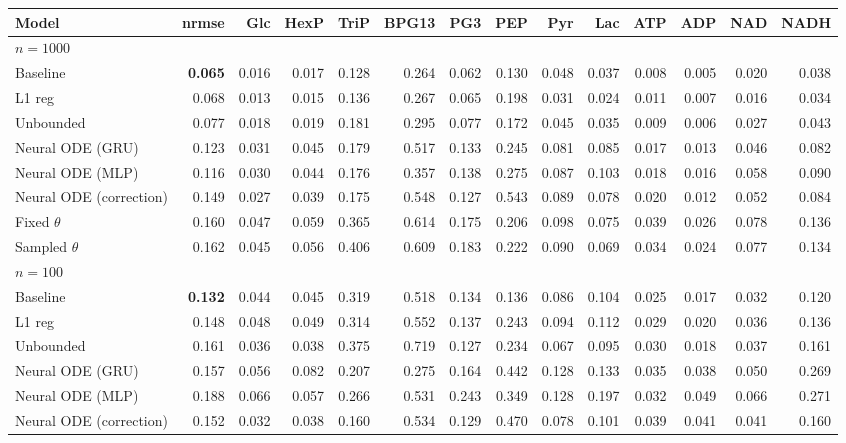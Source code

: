 \begin{tabular}{lrrrrrrrrrrrrr}
\toprule
Model & nrmse & Glc & HexP & TriP & BPG13 & PG3 & PEP & Pyr & Lac & ATP & ADP & NAD & NADH \\
\midrule
\multicolumn{14}{l}{\textbf{$n=1000$}} \\
Baseline & \textbf{0.065} & 0.016 & 0.017 & 0.128 & 0.264 & 0.062 & 0.130 & 0.048 & 0.037 & 0.008 & 0.005 & 0.020 & 0.038 \\
L1 reg & 0.068 & 0.013 & 0.015 & 0.136 & 0.267 & 0.065 & 0.198 & 0.031 & 0.024 & 0.011 & 0.007 & 0.016 & 0.034 \\
Unbounded & 0.077 & 0.018 & 0.019 & 0.181 & 0.295 & 0.077 & 0.172 & 0.045 & 0.035 & 0.009 & 0.006 & 0.027 & 0.043 \\
Neural ODE (GRU) & 0.123 & 0.031 & 0.045 & 0.179 & 0.517 & 0.133 & 0.245 & 0.081 & 0.085 & 0.017 & 0.013 & 0.046 & 0.082 \\
Neural ODE (MLP) & 0.116 & 0.030 & 0.044 & 0.176 & 0.357 & 0.138 & 0.275 & 0.087 & 0.103 & 0.018 & 0.016 & 0.058 & 0.090 \\
Neural ODE (correction) & 0.149 & 0.027 & 0.039 & 0.175 & 0.548 & 0.127 & 0.543 & 0.089 & 0.078 & 0.020 & 0.012 & 0.052 & 0.084 \\
Fixed $\theta$ & 0.160 & 0.047 & 0.059 & 0.365 & 0.614 & 0.175 & 0.206 & 0.098 & 0.075 & 0.039 & 0.026 & 0.078 & 0.136 \\
Sampled $\theta$ & 0.162 & 0.045 & 0.056 & 0.406 & 0.609 & 0.183 & 0.222 & 0.090 & 0.069 & 0.034 & 0.024 & 0.077 & 0.134 \\
\midrule
\multicolumn{14}{l}{\textbf{$n=100$}} \\
Baseline & \textbf{0.132} & 0.044 & 0.045 & 0.319 & 0.518 & 0.134 & 0.136 & 0.086 & 0.104 & 0.025 & 0.017 & 0.032 & 0.120 \\
L1 reg & 0.148 & 0.048 & 0.049 & 0.314 & 0.552 & 0.137 & 0.243 & 0.094 & 0.112 & 0.029 & 0.020 & 0.036 & 0.136 \\
Unbounded & 0.161 & 0.036 & 0.038 & 0.375 & 0.719 & 0.127 & 0.234 & 0.067 & 0.095 & 0.030 & 0.018 & 0.037 & 0.161 \\
Neural ODE (GRU) & 0.157 & 0.056 & 0.082 & 0.207 & 0.275 & 0.164 & 0.442 & 0.128 & 0.133 & 0.035 & 0.038 & 0.050 & 0.269 \\
Neural ODE (MLP) & 0.188 & 0.066 & 0.057 & 0.266 & 0.531 & 0.243 & 0.349 & 0.128 & 0.197 & 0.032 & 0.049 & 0.066 & 0.271 \\
Neural ODE (correction) & 0.152 & 0.032 & 0.038 & 0.160 & 0.534 & 0.129 & 0.470 & 0.078 & 0.101 & 0.039 & 0.041 & 0.041 & 0.160 \\

\end{tabular}
